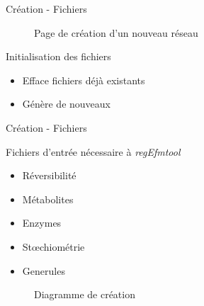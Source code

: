 \documentclass{beamer}
\begin{document}
\begin{frame}{\textcolor{bleu2}{\hspace{1cm}Création - Fichiers}}
	\begin{figure}[!ht]
		\begin{center}
			\caption{Page de création d'un nouveau réseau}
			\end{center}
	\end{figure}
	\begin{center}
		\begin{minipage}[c]{0.9\textwidth}
			\begin{block}{\hspace{0.2cm}Initialisation des fichiers}
				\begin{itemize}
					\item Efface fichiers déjà existants
					\item Génère de nouveaux
				\end{itemize}
			\end{block}
		\end{minipage}
	\end{center}
\end{frame}

\begin{frame}{\textcolor{bleu2}{\hspace{1cm}Création - Fichiers}}
	\begin{center}
		\begin{minipage}[c]{0.9\textwidth}
			\begin{block}{\hspace{0.2cm}Fichiers d'entrée nécessaire à \emph{regEfmtool}}
				\begin{itemize}
					\item Réversibilité
					\item Métabolites
					\item Enzymes
					\item Stœchiométrie
					\item Generules
				\end{itemize}
			\end{block}
		\end{minipage}
	\end{center}
	\begin{figure}[!ht]
		\begin{center}
			\caption{Diagramme de création}
  		\end{center}
	\end{figure}
\end{frame}
\end{document}
